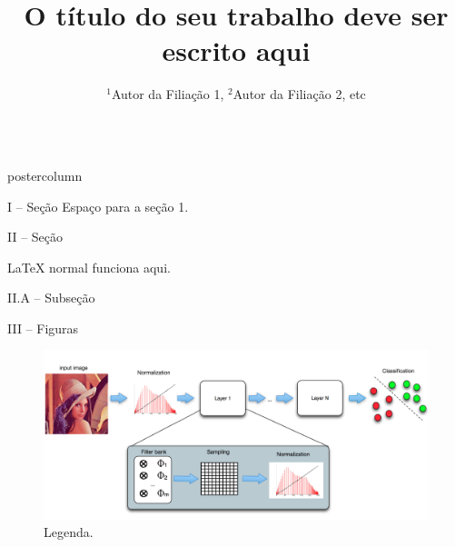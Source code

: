 \documentclass[final,hyperref={pdfpagelabels=false}]{beamer}
\title{\Huge O título do seu trabalho deve ser escrito aqui}
\author{\Large $^1$Autor da Filiação 1, $^2$Autor da Filiação 2, etc}
\institute[UNESP, ETC]{$^1$Universidade Estadual Paulista - Brasil, $^2$Filiação 2 - Brasil}
\newlength{\columnheight}
\begin{document}
\begin{frame}
	\begin{columns}
		\begin{column}{.45\textwidth}
			\begin{beamercolorbox}[center,wd=\textwidth]{postercolumn}
				\begin{minipage}[T]{.95\textwidth}  %
					\parbox[t][\columnheight]{\textwidth}{ %
						
						\begin{block}
							{\vspace{-6pt} \large I -- Seção}
							Espaço para a seção 1.          
						\end{block}
						\vspace*{14pt}
						
						\begin{block}{\vspace{-6pt} \large II -- Seção}
							\begin{itemize}
								
								{\small \item LaTeX normal funciona aqui.}
								
								
							\end{itemize}
						\end{block}
						
						\vspace*{14pt}
						
						\begin{block}{\vspace{-6pt} \large II.A -- Subseção}
						\end{block}
						
						\begin{block}{\vspace{-6pt} \large III -- Figuras}
							
							\begin{figure}[h]
								\centering
								\includegraphics[scale=1.00]{figs/deep.pdf}
								\caption{\small Legenda.}
								\label{f.deep_architecture}
							\end{figure}
							

\end{block}}
\end{minipage}
\end{beamercolorbox}
\end{column}
\end{columns}
\end{frame}
\end{document}
